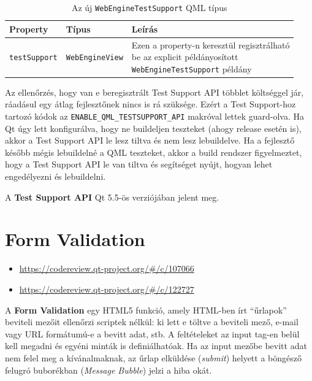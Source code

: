 \documentclass[12pt]{report}
\let\origurl\url
\renewcommand{\url}[1]{%
    \textcolor{blue}{\origurl{#1}}
}
\newcommand{\gerrit}[1]{%
    \textcolor{qtgreen}{\origurl{https://codereview.qt-project.org/\#/c/#1}}
}
\begin{document}
\begin{table}[h!]
    \centering
    \begin{tabular}{ | l | l | p{216pt} | }
        \hline
        \textbf{Property} & \textbf{Típus} & \textbf{Leírás} \\ \hline

        \texttt{testSupport} & \texttt{WebEngineView} &
        \makecell[l]{
            Ezen a property-n keresztül regisztrálható \\
            be az explicit példányosított \\
            \texttt{WebEngineTestSupport} példány}
        \\ \hline
    \end{tabular}
    \caption{
        \label{tab:test-support-webengine-view}
        Az új \texttt{WebEngineTestSupport} QML típus
    }
\end{table}

Az ellenőrzés, hogy van e beregisztrált Test Support API többlet költséggel jár, ráadásul
egy átlag fejlesztőnek nincs is rá szüksége. Ezért a Test Support-hoz tartozó kódok az
\texttt{ENABLE\_QML\_TESTSUPPORT\_API} makróval lettek guard-olva. Ha Qt úgy lett
konfigurálva, hogy ne buildeljen teszteket (ahogy release esetén is), akkor a Test Support
API le lesz tiltva és nem lesz lebuildelve. Ha a fejlesztő később mégis lebuildelné a
QML teszteket, akkor a build rendszer figyelmeztet, hogy a Test Support API le van tiltva
és segítséget nyújt, hogyan lehet engedélyezni és lebuildelni.

A \textbf{Test Support API} Qt 5.5-ös verziójában jelent meg.


\section{Form Validation}

\begin{center}
    \begin{reviewbox}
        \begin{itemize}
            \renewcommand{\labelitemi}{\textcolor{qtgreen}{$\blacktriangleright$}}
            \item \gerrit{107066}
            \item \gerrit{122727}
        \end{itemize}
    \end{reviewbox}
\end{center}

\noindent
A \textbf{Form Validation} egy HTML5 funkció, amely HTML-ben írt ``űrlapok'' beviteli
mezőit ellenőrzi scriptek nélkül: ki lett e töltve a beviteli mező, e-mail vagy URL
formátumú-e a bevitt adat, stb. A feltételeket az input tag-en belül kell megadni és
egyéni minták is definiálhatóak. Ha az input mezőbe bevitt adat nem felel meg a
kívánalmaknak, az űrlap elküldése (\textit{submit}) helyett a böngésző felugró buborékban
(\textit{Message Bubble}) jelzi a hiba okát.
\end{document}
